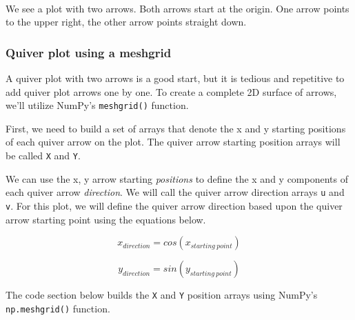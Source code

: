 \documentclass{book}
\newcommand{\passthrough}[1]{#1}
\begin{document}
    \begin{center}
    \end{center}
    { \hspace*{\fill} \\}
    

    
        We see a plot with two arrows. Both arrows start at the origin. One
arrow points to the upper right, the other arrow points straight down.
    




    
        \hypertarget{quiver-plot-using-a-meshgrid}{%
\subsubsection{Quiver plot using a
meshgrid}\label{quiver-plot-using-a-meshgrid}}

A quiver plot with two arrows is a good start, but it is tedious and
repetitive to add quiver plot arrows one by one. To create a complete 2D
surface of arrows, we'll utilize NumPy's
\passthrough{\lstinline!meshgrid()!} function.

First, we need to build a set of arrays that denote the x and y starting
positions of each quiver arrow on the plot. The quiver arrow starting
position arrays will be called \passthrough{\lstinline!X!} and
\passthrough{\lstinline!Y!}.

We can use the x, y arrow starting \emph{positions} to define the x and
y components of each quiver arrow \emph{direction}. We will call the
quiver arrow direction arrays \passthrough{\lstinline!u!} and
\passthrough{\lstinline!v!}. For this plot, we will define the quiver
arrow direction based upon the quiver arrow starting point using the
equations below.

\[ x_{direction} = cos(x_{starting \ point}) \]

\[ y_{direction} = sin(y_{starting \ point}) \]

The code section below builds the \passthrough{\lstinline!X!} and
\passthrough{\lstinline!Y!} position arrays using NumPy's
\passthrough{\lstinline!np.meshgrid()!} function.
    
\end{document}
